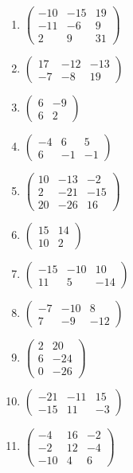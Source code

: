 \begin{enumerate}[label=\arabic*., leftmargin=*, itemsep=1pt]
\item $\left(\begin{smallmatrix}-10 & -15 & 19\\ -11 & -6 & 9\\ 2 & 9 & 31\end{smallmatrix}\right)$
\item $\left(\begin{smallmatrix}17 & -12 & -13\\ -7 & -8 & 19\end{smallmatrix}\right)$
\item $\left(\begin{smallmatrix}6 & -9\\ 6 & 2\end{smallmatrix}\right)$
\item $\left(\begin{smallmatrix}-4 & 6 & 5\\ 6 & -1 & -1\end{smallmatrix}\right)$
\item $\left(\begin{smallmatrix}10 & -13 & -2\\ 2 & -21 & -15\\ 20 & -26 & 16\end{smallmatrix}\right)$
\item $\left(\begin{smallmatrix}15 & 14\\ 10 & 2\end{smallmatrix}\right)$
\item $\left(\begin{smallmatrix}-15 & -10 & 10\\ 11 & 5 & -14\end{smallmatrix}\right)$
\item $\left(\begin{smallmatrix}-7 & -10 & 8\\ 7 & -9 & -12\end{smallmatrix}\right)$
\item $\left(\begin{smallmatrix}2 & 20\\ 6 & -24\\ 0 & -26\end{smallmatrix}\right)$
\item $\left(\begin{smallmatrix}-21 & -11 & 15\\ -15 & 11 & -3\end{smallmatrix}\right)$
\item $\left(\begin{smallmatrix}-4 & 16 & -2\\ -2 & 12 & -4\\ -10 & 4 & 6\end{smallmatrix}\right)$

\end{enumerate}
